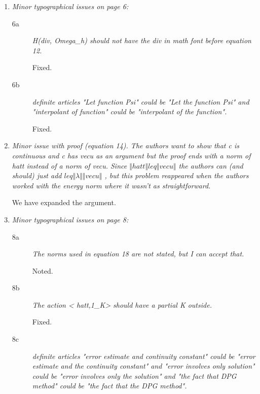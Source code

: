\documentclass[11pt,c]{article}
\begin{document}
\begin{enumerate}

  \item {\em Minor typographical issues on page 6:}
\begin{description}
  \item [6a] {\em  H(div, Omega\_h) should not have the div in math font before equation 12.}

Fixed.

  \item [6b] {\em  definite articles "Let function Psi" could be "Let the function Psi" and "interpolant of function" could be "interpolant of the function".}

Fixed.
\end{description}


  \item {\em Minor issue with proof (equation 14).  The authors want to show that c is continuous and c has vec{u} as an argument but the proof ends with a norm of hat{t} instead of a norm of vec{u}.  Since $\Vert hat{t}\Vert  leq \Vert vec{u}\Vert$  the authors can (and should) just add $leq \Vert  \lambda\Vert  \Vert vec{u}\Vert$ , but this problem reappeared when the authors worked with the energy norm where it wasn't as straightforward.}

We have expanded the argument.

  \item {\em Minor typographical issues on page 8:}
\begin{description}
  \item [8a] {\em  The norms used in equation 18 are not stated, but I can accept that.}

Noted.

  \item [8b] {\em The action < hat{t},1\_K> should have a partial K outside.}

Fixed.

  \item [8c] {\em  definite articles "error estimate and continuity constant" could be "error estimate and the continuity constant" and "error involves only solution" could be "error involves only the solution" and "the fact that DPG method" could be "the fact that the DPG method".}


\end{description}
\end{enumerate}
\end{document}
